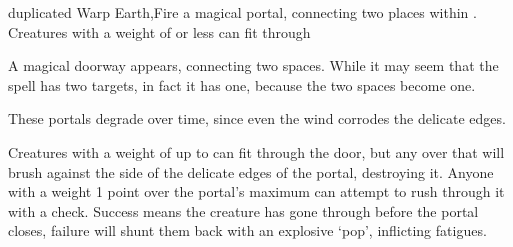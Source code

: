   {duplicated}%
  {Warp}%
  {Earth,Fire}%
  {}%
  {a magical portal, connecting two places within \spellRange. Creatures with a \gls{weight} of  or less can fit through}%
  {
    A magical doorway appears, connecting two spaces.
    While it may seem that the spell has two targets, in fact it has one, because the two spaces become one.

    These portals degrade over time, since even the wind corrodes the delicate edges.

    Creatures with a \gls{weight} of up to  can fit through the door, but any over that will brush against the side of the delicate edges of the portal, destroying it.
    Anyone with a \gls{weight} 1 point over the portal's maximum can attempt to rush through it with a  check.
    Success means the creature has gone through before the portal closes, failure will shunt them back with an explosive `pop', inflicting  \glspl{fatigue}.
  }


